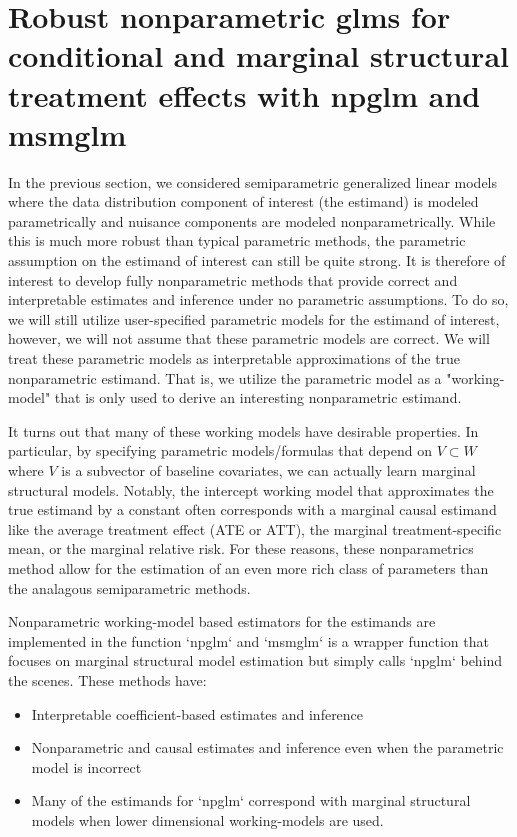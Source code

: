 \documentclass[article]{jss}
\begin{document}
\section{Robust nonparametric glms for conditional and marginal structural treatment effects with npglm and msmglm}
In the previous section, we considered semiparametric generalized linear models where the data distribution component of interest (the estimand) is modeled parametrically and nuisance components are modeled nonparametrically. While this is much more robust than typical parametric methods, the parametric assumption on the estimand of interest can still be quite strong. It is therefore of interest to develop fully nonparametric methods that provide correct and interpretable estimates and inference under no parametric assumptions. To do so, we will still utilize user-specified parametric models for the estimand of interest, however, we will not assume that these parametric models are correct. We will treat these parametric models as interpretable approximations of the true nonparametric estimand. That is, we utilize the parametric model as a "working-model" that is only used to derive an interesting nonparametric estimand.

It turns out that many of these working models have desirable properties. In particular, by specifying parametric models/formulas that depend on $V \subset W$ where $V$ is a subvector of baseline covariates, we can actually learn marginal structural models. Notably, the intercept working model that approximates the true estimand by a constant often corresponds with a marginal causal estimand like the average treatment effect (ATE or ATT), the marginal treatment-specific mean, or the marginal relative risk. For these reasons, these nonparametrics method allow for the estimation of an even more rich class of parameters than the analagous semiparametric methods.

Nonparametric working-model based estimators for the estimands are implemented in the function `npglm` and `msmglm` is a wrapper function that focuses on marginal structural model estimation but simply calls `npglm` behind the scenes. These methods have:

\begin{itemize}
\item Interpretable coefficient-based estimates and inference
\item Nonparametric and causal estimates and inference even when the parametric model is incorrect
\item Many of the estimands for `npglm` correspond with marginal structural models when lower dimensional working-models are used.
\end{itemize}
\end{document}
